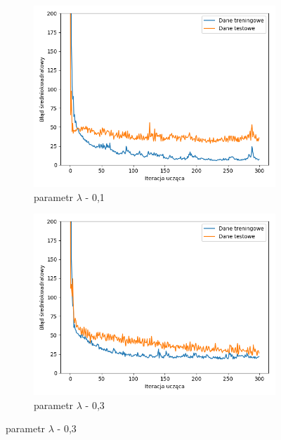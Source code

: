 \documentclass[12pt]{aghdpl}
\begin{document}
		 \begin{figure}[h]
		 	\begin{subfigure}{.5\linewidth}
		 		\includegraphics[width =\linewidth]{wykresy/6_regularyzacja/l2/regularyzacja_0_1_wykres_uczenia.png}
		 		\caption{parametr $\lambda$ - 0,1}
		 	\end{subfigure}
		 	\begin{subfigure}{.5\linewidth}
		 		\includegraphics[width =\linewidth]{wykresy/6_regularyzacja/l2/regularyzacja_0_3_wykres_uczenia.png}
		 		\caption{parametr $\lambda$ - 0,3}
		 	\end{subfigure}
		 	

\end{figure}
\end{document}
